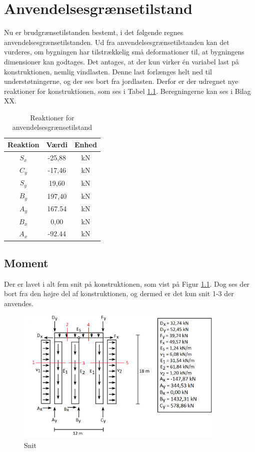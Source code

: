 \chapter{Anvendelsesgrænsetilstand}
Nu er brudgrænsetilstanden bestemt, i det følgende regnes anvendelsesgrænsetilstanden. Ud fra anvendelsesgrænsetilstanden kan det vurderes, om bygningen har tilstrækkelig små deformationer til, at bygningens dimensioner kan godtages. 
\newline \indent{     }  Det antages, at der kun virker én variabel last på konstruktionen, nemlig vindlasten. Denne last forlænges helt ned til understøtningerne, og der ses bort fra jordlasten. Derfor er der udregnet nye reaktioner for konstruktionen, som ses i Tabel \ref{tab:anden}. Beregningerne kan ses i Bilag XX. 

\begin{table}
	\begin{center}
		\begin{tabular}{|c|c|c|}
			\hline
			Reaktion & Værdi & Enhed \\ \hline
			$S_x$ & -25,88 		& kN      \\ \hline
			$C_y$ & -17,46 		& kN      \\ \hline
			$S_y$ & 19,60 		& kN       \\ \hline
			$B_y$ & 197,40		& kN      \\ \hline
			$A_y$ & 167.54 		& kN      \\ \hline
			$B_x$ & 0,00 		& kN      \\ \hline
			$A_x$ & -92.44 		& kN       \\ \hline
		\end{tabular}
		\caption{Reaktioner for anvendelsesgrænsetilstand}
		\label{tab:anden}
	\end{center}
\end{table}

\section{Moment}
Der er lavet i alt fem snit på konstruktionen, som vist på Figur \ref{fig:snitanvendelse}. Dog ses der bort fra den højre del af konstruktionen, og dermed er det kun snit 1-3 der anvendes. 

\begin{figure}[H]
	\centering
	\includegraphics[width=0.9\textwidth]{billeder/snitanvendelse.png}
	\caption{Snit}
	\label{fig:snitanvendelse}
\end{figure}

